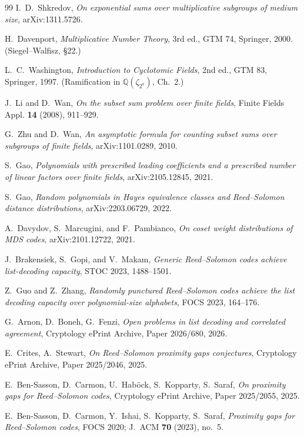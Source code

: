 \documentclass[11pt]{article}
\theoremstyle{definition}
\newcommand{\Q}{\mathbb Q}
\begin{document}
\begin{thebibliography}{99}
I.~D.~Shkredov,
\emph{On exponential sums over multiplicative subgroups of medium size},
arXiv:1311.5726.

H.~Davenport,
\emph{Multiplicative Number Theory}, 3rd ed., GTM 74, Springer, 2000.  (Siegel--Walfisz, \S22.)

L.~C.~Washington,
\emph{Introduction to Cyclotomic Fields}, 2nd ed., GTM 83, Springer, 1997.  (Ramification in $\Q(\zeta_{2^a})$, Ch.~2.)

J.~Li and D.~Wan,
\emph{On the subset sum problem over finite fields},
Finite Fields Appl. \textbf{14} (2008), 911--929.

G.~Zhu and D.~Wan,
\emph{An asymptotic formula for counting subset sums over subgroups of finite fields},
arXiv:1101.0289, 2010.

S.~Gao,
\emph{Polynomials with prescribed leading coefficients and a prescribed number of linear factors over finite fields},
arXiv:2105.12845, 2021.

S.~Gao,
\emph{Random polynomials in Hayes equivalence classes and Reed--Solomon distance distributions},
arXiv:2203.06729, 2022.

A.~Davydov, S.~Marcugini, and F.~Pambianco,
\emph{On coset weight distributions of MDS codes},
arXiv:2101.12722, 2021.

J.~Brakensiek, S.~Gopi, and V.~Makam,
\emph{Generic Reed--Solomon codes achieve list-decoding capacity},
STOC 2023, 1488--1501.

Z.~Guo and Z.~Zhang,
\emph{Randomly punctured Reed--Solomon codes achieve the list decoding capacity over polynomial-size alphabets},
FOCS 2023, 164--176.

G.~Arnon, D.~Boneh, G.~Fenzi,
\emph{Open problems in list decoding and correlated agreement},
Cryptology ePrint Archive, Paper 2026/680, 2026.

E.~Crites, A.~Stewart,
\emph{On Reed--Solomon proximity gaps conjectures},
Cryptology ePrint Archive, Paper 2025/2046, 2025.

E.~Ben-Sasson, D.~Carmon, U.~Hab\"ock, S.~Kopparty, S.~Saraf,
\emph{On proximity gaps for Reed--Solomon codes},
Cryptology ePrint Archive, Paper 2025/2055, 2025.

E.~Ben-Sasson, D.~Carmon, Y.~Ishai, S.~Kopparty, S.~Saraf,
\emph{Proximity gaps for Reed--Solomon codes},
FOCS 2020; J.~ACM \textbf{70} (2023), no.~5.


\end{thebibliography}
\end{document}
